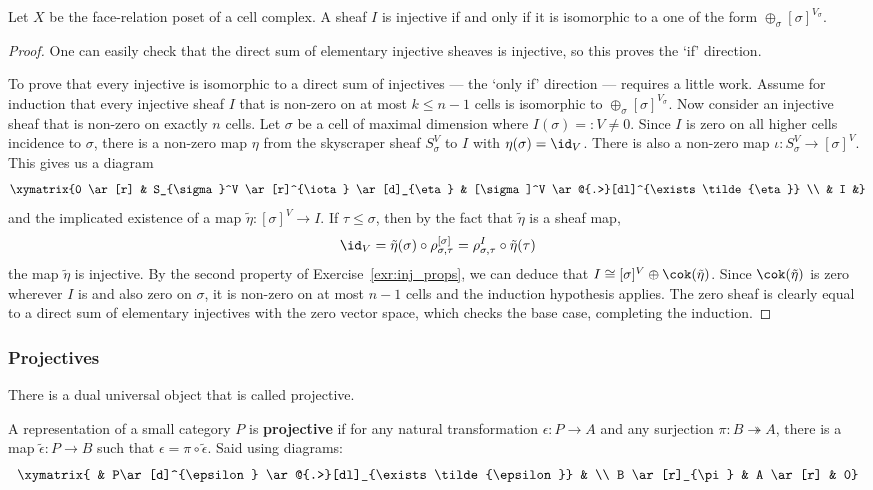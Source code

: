 \begin{lem}\label{lem:inj}
Let $X$ be the face-relation poset of a cell complex. A sheaf $I$ is injective if and only if it is isomorphic to a one of the form $\oplus_{\sigma}[\sigma]^{V_{\sigma}}$.
\end{lem}
\begin{proof}
One can easily check that the direct sum of elementary injective sheaves is injective, so this proves the `if' direction.

To prove that every injective is isomorphic to a direct sum of injectives --- the `only if' direction --- requires a little work. Assume for induction that every injective sheaf $I$ that is non-zero on at most $k\leq n-1$ cells is isomorphic to $\oplus_{\sigma}[\sigma]^{V_{\sigma}}$. Now consider an injective sheaf that is non-zero on exactly $n$ cells. Let $\sigma$ be a cell of maximal dimension where $I(\sigma)=:V\neq 0$. Since $I$ is zero on all higher cells incidence to $\sigma$, there is a non-zero map $\eta$ from the skyscraper sheaf $S^V_{\sigma}$ to $I$ with $\eta(\sigma)=\id_V$. There is also a non-zero map $\iota:S_{\sigma}^V\to[\sigma]^V$. This gives us a diagram
\[
 \xymatrix{0 \ar[r] & S_{\sigma}^V \ar[r]^{\iota} \ar[d]_{\eta} & [\sigma]^V \ar@{.>}[dl]^{\exists \tilde{\eta}} \\ & I &}
\]
and the implicated existence of a map $\tilde{\eta}:[\sigma]^V\to I$. If $\tau\leq \sigma$, then by the fact that $\tilde{\eta}$ is a sheaf map,
\[
\id_V=\tilde{\eta}(\sigma)\circ \rho^{[\sigma]}_{\sigma,\tau}=\rho^{I}_{\sigma,\tau}\circ \tilde{\eta}(\tau)
\]
the map $\tilde{\eta}$ is injective. By the second property of Exercise~\ref{exr:inj_props}, we can deduce that $I\cong [\sigma]^V\oplus \cok(\tilde{\eta})$. Since $\cok(\tilde{\eta})$ is zero wherever $I$ is and also zero on $\sigma$, it is non-zero on at most $n-1$ cells and the induction hypothesis applies. The zero sheaf is clearly equal to a direct sum of elementary injectives with the zero vector space, which checks the base case, completing the induction.
\end{proof}

\subsubsection{Projectives}

There is a dual universal object that is called projective.
\begin{defn}
 A representation of a small category $P$ is \textbf{projective} if for any natural transformation $\epsilon:P\to A$ and any surjection $\pi:B\twoheadrightarrow A$, there is a map $\tilde{\epsilon}:P\to B$ such that $\epsilon=\pi\circ \tilde{\epsilon}$. Said using diagrams:
\[
 \xymatrix{ & P\ar[d]^{\epsilon} \ar@{.>}[dl]_{\exists \tilde{\epsilon}} & \\ B \ar[r]_{\pi} &  A \ar[r] & 0}
\]
\end{defn}

